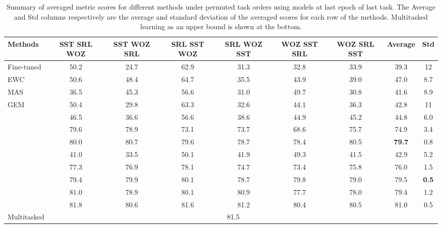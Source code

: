 \documentclass{article} \usepackage{iclr2020_conference,times}
\begin{document}
\begin{table*}[t]
\centering
\begin{adjustbox}{max width=\textwidth}
    \begin{tabular}{l*{6}c|c|c}
    \toprule
    Methods & {\scriptsize SST SRL WOZ} & {\scriptsize SST WOZ SRL} & {\scriptsize SRL SST WOZ} & {\scriptsize SRL WOZ SST} & {\scriptsize WOZ SST SRL} & {\scriptsize WOZ SRL SST} & Average & Std \\
    \midrule
    Fine-tuned & 50.2 & 24.7 & 62.9 & 31.3 & 32.8 & 33.9 & 39.3 & 12\\
    EWC & 50.6 & 48.4 & 64.7 & 35.5 & 43.9 & 39.0 & 47.0 & 8.7\\
    MAS & 36.5 & 45.3 & 56.6 & 31.0 & 49.7 & 30.8 & 41.6 & 8.9\\
    GEM & 50.4 & 29.8 & 63.3 & 32.6 & 44.1 & 36.3 & 42.8 & 11 \\
     & 46.5 & 36.6 & 56.6 & 38.6 & 44.9 & 45.2 & 44.8 & 6.0\\
     & 79.6 & 78.9 & 73.1 & 73.7 & 68.6 & 75.7 & 74.9 & 3.4\\
     & 80.0 & 80.7 & 79.6 & 78.7 & 78.4 & 80.5 & \textbf{79.7} & 0.8 \\
     & 41.0 & 33.5 & 50.1 & 41.9 & 49.3 & 41.5 & 42.9 & 5.2\\
     & 77.3 & 76.9 & 78.1 & 74.7 & 73.4 & 75.8 & 76.0 & 1.5\\
     & 79.4 & 79.9 & 80.1 & 78.7 & 79.8 & 79.0 & 79.5 & \textbf{0.5}\\
    \midrule
     & 81.0 & 78.9 & 80.1 & 80.9 & 77.7 & 78.0 & 79.4 & 1.2\\
     & 81.8 & 80.6 & 81.6 & 81.2 & 80.4 & 80.5 & 81.0 & 0.5\\
    \midrule
    Multitasked & \multicolumn{7}{c}{81.5} \\
    \bottomrule
    \end{tabular}
    \end{adjustbox}
    \caption{Summary of averaged metric scores for different methods under permuted task orders using models at last epoch of last task. The Average and Std columns respectively are the average and standard deviation of the averaged scores for each row of the methods. Multitasked learning as an upper bound is shown at the bottom.}
\label{tab:small_perm}
\end{table*}
%
\end{document}
